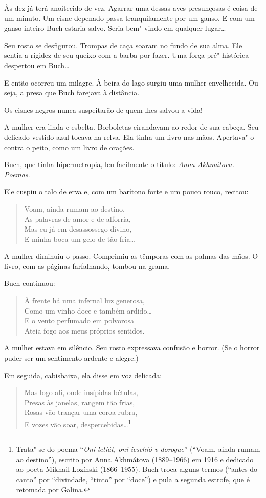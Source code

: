 Às dez já terá anoitecido de vez. Agarrar uma dessas aves presunçosas é
coisa de um minuto. Um cisne depenado passa tranquilamente por um ganso.
E com um ganso inteiro Buch estaria salvo. Seria bem"-vindo em qualquer
lugar\ldots{}

Seu rosto se desfigurou. Trompas de caça soaram no fundo de sua alma.
Ele sentia a rigidez de seu queixo com a barba por fazer. Uma força
pré"-histórica despertou em Buch\ldots{}

E então ocorreu um milagre. À beira do lago surgiu uma mulher
envelhecida. Ou seja, a presa que Buch farejava à distância.

Os cisnes negros nunca suspeitarão de quem lhes salvou a vida!

A mulher era linda e esbelta. Borboletas cirandavam ao redor de sua
cabeça. Seu delicado vestido azul tocava na relva. Ela tinha um livro
nas mãos. Apertava"-o contra o peito, como um livro de orações.

Buch, que tinha hipermetropia, leu facilmente o título: \emph{Anna
Akhmátova. Poemas}.

Ele cuspiu o talo de erva e, com um barítono forte e um pouco rouco,
recitou:

\begin{verse}
Voam, ainda rumam ao destino,\\
As palavras de amor e de alforria,\\
Mas eu já em desassossego divino,\\
E minha boca um gelo de tão fria\ldots{}
\end{verse}

A mulher diminuiu o passo. Comprimiu as têmporas com as palmas das mãos.
O livro, com as páginas farfalhando, tombou na grama.

Buch continuou:

\begin{verse}
À frente há uma infernal luz generosa,\\
Como um vinho doce e também ardido\ldots{}\\
E o vento perfumado em polvorosa\\
Ateia fogo aos meus próprios sentidos.
\end{verse}

A mulher estava em silêncio. Seu rosto expressava confusão e horror. (Se
o horror puder ser um sentimento ardente e alegre.)

Em seguida, cabisbaixa, ela disse em voz delicada:

\begin{verse}
Mas logo ali, onde insípidas bétulas,\\
Presas às janelas, rangem tão frias,\\
Rosas vão trançar uma coroa rubra,\\
E vozes vão soar, despercebidas\ldots{}\footnote{Trata"-se do poema
  ``\emph{Oni letiát, oni ieschió v dorogue}'' (``Voam, ainda rumam ao
  destino''), escrito por Anna Akhmátova (1889--1966) em 1916 e
  dedicado ao poeta Mikhail Lozínski (1866--1955). Buch troca alguns
  termos (``antes do canto'' por ``divindade, ``tinto'' por ``doce'') e
  pula a segunda estrofe, que é retomada por Galina.}
\end{verse}

